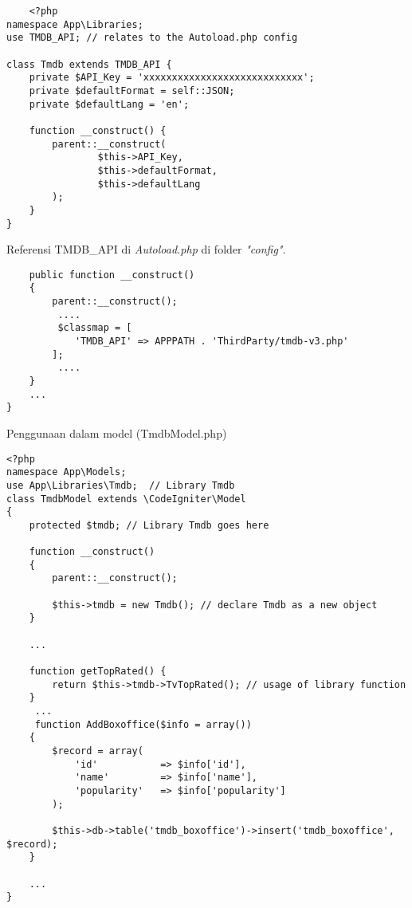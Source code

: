 \begin{verbatim}
    <?php
namespace App\Libraries;
use TMDB_API; // relates to the Autoload.php config
 
class Tmdb extends TMDB_API {
    private $API_Key = 'xxxxxxxxxxxxxxxxxxxxxxxxxxxx';
    private $defaultFormat = self::JSON;
    private $defaultLang = 'en';
 
    function __construct() {
        parent::__construct(
                $this->API_Key, 
                $this->defaultFormat, 
                $this->defaultLang
        );
    }
}
\end{verbatim}

Referensi TMDB\_API di \textit{Autoload.php} di folder \textit{"config"}. 

\begin{verbatim}
    public function __construct()
    {
        parent::__construct();
         ....
         $classmap = [
            'TMDB_API' => APPPATH . 'ThirdParty/tmdb-v3.php'
        ];
         ....
    }
    ...
}
\end{verbatim}

Penggunaan dalam model (TmdbModel.php)

\begin{verbatim}
<?php
namespace App\Models;
use App\Libraries\Tmdb;  // Library Tmdb
class TmdbModel extends \CodeIgniter\Model
{
    protected $tmdb; // Library Tmdb goes here
 
    function __construct()
    {
        parent::__construct();
 
        $this->tmdb = new Tmdb(); // declare Tmdb as a new object
    }
 
    ...
 
    function getTopRated() {
        return $this->tmdb->TvTopRated(); // usage of library function
    }
     ...
     function AddBoxoffice($info = array())
    {
        $record = array(
            'id'           => $info['id'],
            'name'         => $info['name'],
            'popularity'   => $info['popularity']
        );
 
        $this->db->table('tmdb_boxoffice')->insert('tmdb_boxoffice', $record);
    }
 
    ...
}
\end{verbatim}

